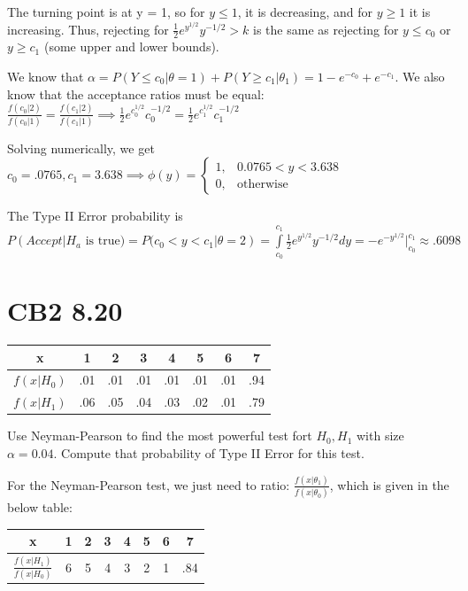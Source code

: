 \documentclass{article}
\let\Oldint=\int
\renewcommand{\int}{\Oldint\limits}
\begin{document}
The turning point is at y = 1, so for $y \le 1$, it is decreasing, and for $y \ge 1$ it is increasing. Thus, rejecting for $\frac{1}{2} e^{y^{1/2}} y^{-1/2} > k$ is the same as rejecting for $y \le c_0$ or $y \ge c_1$ (some upper and lower bounds). 

We know that $\alpha = P(Y \le c_0 | \theta = 1) + P(Y \ge c_1 | \theta_1) = 1 - e^{-c_0} + e^{-c_1}$. We also know that the acceptance ratios must be equal: $\frac{f(c_0|2)}{f(c_0|1)} = \frac{f(c_1|2)}{f(c_1|1)} \implies \frac{1}{2} e^{c_0^{1/2}} c_0^{-1/2} = \frac{1}{2} e^{c_1^{1/2}} c_1^{-1/2}$

Solving numerically, we get $c_0 = .0765, c_1 = 3.638 \implies \phi(y) = \begin{cases} 1, & 0.0765 < y < 3.638 \\ 0, & \text{otherwise} \end{cases}$

The Type II Error probability is $P(Accept|H_a \text{ is true}) = P(c_0 < y < c_1 | \theta = 2) = \int_{c_0}^{c_1} \frac{1}{2} e^{y^{1/2}} y^{-1/2}dy = -e^{-y^{1/2}}|_{c_0}^{c_1} \approx .6098$


\section{CB2 8.20}

\begin{center}
\begin{tabular}{c c c c c c c c} 
 x & 1 & 2 & 3 & 4 & 5 & 6 & 7 \\ [0.5ex] 
 \hline
 $f(x|H_0)$ & .01 & .01 & .01 & .01 & .01 & .01 & .94 \\ 
 $f(x|H_1)$ & .06 & .05 & .04 & .03 & .02 & .01 & .79 \\
\end{tabular}
\end{center}

Use Neyman-Pearson to find the most powerful test fort $H_0, H_1$ with size $\alpha = 0.04$. Compute that probability of Type II Error for this test.


For the Neyman-Pearson test, we just need to ratio: $\frac{f(x|\theta_1)}{f(x|\theta_0)}$, which is given in the below table:

\begin{center}
\begin{tabular}{c c c c c c c c} 
 x & 1 & 2 & 3 & 4 & 5 & 6 & 7 \\ [0.5ex] 
 \hline
 $\frac{f(x|H_1)}{f(x|H_0)}$ & 6 & 5 & 4 & 3 & 2 & 1 & .84 \\ 
\end{tabular}
\end{center}
\end{document}
